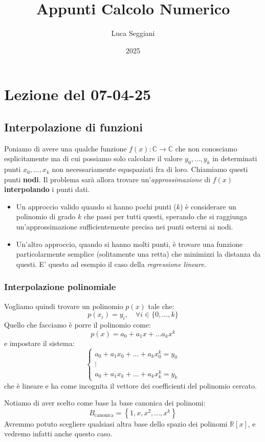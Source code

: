 \documentclass[a4paper,11pt]{article}
\title{Appunti Calcolo Numerico}
\author{Luca Seggiani}
\date{2025}
\begin{document}
\section{Lezione del 07-04-25}

\thispagestyle{empty}
\pagestyle{fancy}

\subsection{Interpolazione di funzioni}
Poniamo di avere una qualche funzione $f(x) : \mathbb{C} \rightarrow \mathbb{C}$ che non conosciamo esplicitamente ma di cui possiamo solo calcolare il valore $y_0, ..., y_k$ in determinati punti $x_0, ..., x_k$ non necessariamente equspaziati fra di loro.
Chiamiamo questi punti \textbf{nodi}.
Il problema sarà allora trovare un'\textit{approssimazione} di $f(x)$ \textbf{interpolando} i punti dati.
\begin{itemize}
	\item 
Un approccio valido quando si hanno pochi punti ($k$) è considerare un polinomio di grado $k$ che passi per tutti questi, sperando che si raggiunga un'approssimazione sufficientemente precisa nei punti esterni ai nodi.
	\item
Un'altro approccio, quando si hanno molti punti, è trovare una funzione particolarmente semplice (solitamente una retta) che minimizzi la distanza da questi.
E' questo ad esempio il caso della \textit{regressione lineare}.
\end{itemize}

\subsubsection{Interpolazione polinomiale}
Vogliamo quindi trovare un polinomio $p(x)$ tale che:
$$
p(x_i) = y_i, \quad \forall i \in \{ 0, ..., k \}
$$
Quello che facciamo è porre il polinomio come:
$$
p(x) = a_0 + a_1 x + ... a_k x^k
$$
e impostare il sistema:
\[
	\begin{cases}
		a_0 + a_1 x_0 + ... + a_k x_0^k = y_0 \\ 
		\vdots \\
		a_0 + a_1 x_k + ... + a_k x_k^k = y_k
	\end{cases}
\]
che è lineare e ha come incognita il vettore dei coefficienti del polinomio cercato.

Notiamo di aver scelto come base la base canonica dei polinomi:
$$
B_\text{canonica} = \left\{ 1, x, x^2, ..., x^k \right\}
$$
Avremmo potuto scegliere qualsiasi altra base dello spazio dei polinomi $\mathbb{R}[x]$, e vedremo infatti anche questo caso.
\end{document}
